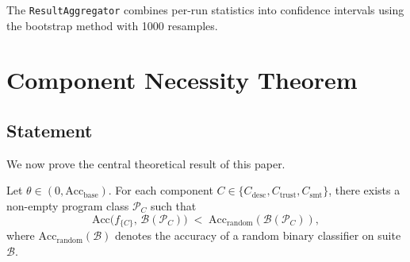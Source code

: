 \documentclass[11pt]{article}
\newcommand{\Acc}{\mathrm{Acc}}             %
\newcommand{\AccBase}{\Acc_{\mathrm{base}}} %
\newcommand{\PClass}[1]{\mathcal{P}_{#1}}   %
\newcommand{\Random}{\mathrm{random}}       %
\newcommand{\DescComp}{C_{\mathrm{desc}}}   %
\newcommand{\TrustComp}{C_{\mathrm{trust}}} %
\newcommand{\SMTComp}{C_{\mathrm{smt}}}     %
\newcommand{\Threshold}{\theta}             %
\begin{document}
The \texttt{ResultAggregator} combines per-run statistics into
confidence intervals using the bootstrap method with 1000 resamples.

\section{Component Necessity Theorem}
\label{sec:theorem}

\subsection{Statement}
\label{subsec:theorem-statement}

We now prove the central theoretical result of this paper.

\begin{theorem}
\label{thm:necessity}
Let $\Threshold \in (0, \AccBase)$.  For each component
$C \in \{\DescComp, \TrustComp, \SMTComp\}$, there exists a
non-empty program class $\PClass{C}$ such that
\[
  \Acc\!\bigl(f_{\{C\}},\, \mathcal{B}(\PClass{C})\bigr)
  \;<\;
  \Acc_{\Random}(\mathcal{B}(\PClass{C})),
\]
where $\Acc_{\Random}(\mathcal{B})$ denotes the accuracy of a random
binary classifier on suite $\mathcal{B}$.
\end{theorem}
\end{document}
